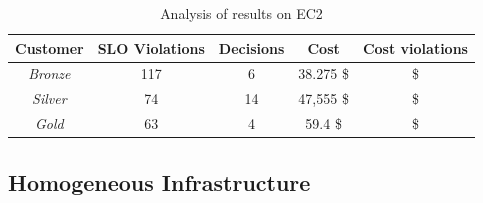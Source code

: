 


\begin{table}\label{summaryEC2}
  {\scriptsize 
\begin{center}
    \begin{tabular}{  | c | c | c | c | c |}
    \hline
         \textbf{Customer}  & \textbf{SLO Violations} & \textbf{Decisions}  & \textbf{Cost}  & \textbf{Cost violations} \\ \hline
   \textit{Bronze}   &  117 &  6 &  38.275 \$ &  \$ \\ \hline   
   \textit{Silver}  &  74 &  14 &  47,555 \$ &   \$ \\ \hline   
\textit{Gold} &   63  &  4 &  59.4 \$ &  \$ \\ \hline   

 \end{tabular}
\end{center}
\vspace{-5mm}
\caption{Analysis of results on EC2}
\label{summaryEC2}
}
\end{table}






\subsection{Homogeneous Infrastructure}

